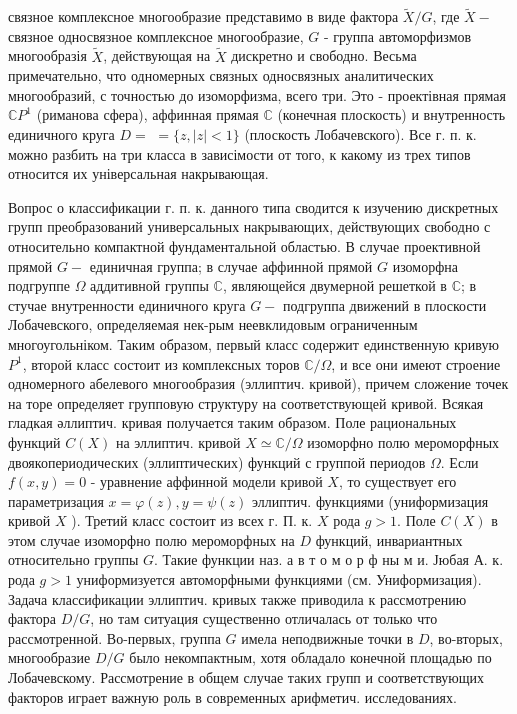 \documentclass[10pt]{article}
\begin{document}
связное комплексное многообразие представимо в виде фактора $\tilde{X} / G$, где $\tilde{X}-$ связное односвязное комплексное многообразие, $G$ - группа автоморфизмов многообразія $\tilde{X}$, действующая на $\tilde{X}$ дискретно и свободно. Весьма примечательно, что одномерных связных односвязных аналитических многообразий, с точностью до изоморфизма, всего три. Это - проектівная прямая $\mathbb{C} P^{1}$ (риманова сфера), аффинная прямая $\mathbb{C}$ (конечная плоскость) и внутренность единичного круга $D=$ $=\{z,|z|<1\}$ (плоскость Лобачевского). Все г. п. к. можно разбить на три класса в зависімости от того, к какому из трех типов относится их універсальная накрывающая.



Вопрос о классификации г. п. к. данного типа сводится к изучению дискретных групп преобразований универсальных накрывающих, действующих свободно с относительно компактной фундаментальной областью. В случае проективной прямой $G-$ единичная группа; в случае аффинной прямой $G$ изоморфна подгруппе $\Omega$ аддитивной группы $\mathbb{C}$, являющейся двумерной решеткой в $\mathbb{C}$; в стучае внутренности единичного круга $G-$ подгруппа движений в плоскости Лобачевского, определяемая нек-рым неевклидовым ограниченным многоугольніком. Таким образом, первый класс содержит единственную кривую $P^{1}$, второй класс состоит из комплексных торов $\mathbb{C} / \Omega$, и все они имеют строение одномерного абелевого многообразия (эллиптич. кривой), причем сложение точек на торе определяет групповую структуру на соответствующей кривой. Всякая гладкая әллиптич. кривая получается таким образом. Поле рациональных функций $C(X)$ на эллиптич. кривой $X \simeq \mathbb{C} / \Omega$ изоморфно полю мероморфных двоякопериодических (эллиптических) функций с группой периодов $\Omega$. Если $f(x, y)=0$ - уравнение аффинной модели кривой $X$, то существует его параметризация $x=\varphi(z), y=\psi(z)$ эллиптич. функциями (униформизация кривой $X$ ). Третий класс состоит из всех г. П. к. $X$ рода $g>1$. Поле $C(X)$ в этом случае изоморфно полю мероморфных на $D$ функций, инвариантных относительно группы $G$. Такие функции наз. а в т о м о р ф ны м и. Јюбая А. к. рода $g>1$ униформизуется автоморфными функциями (см. Униформизация). Задача классификации эллиптич. кривых также приводила к рассмотрению фактора $D / G$, но там ситуация существенно отличалась от только что рассмотренной. Во-первых, группа $G$ имела неподвижные точки в $D$, во-вторых, многообразие $D / G$ было некомпактным, хотя обладало конечной площадью по Лобачевскому. Рассмотрение в общем случае таких групп и соответствующих факторов играет важную роль в современных арифметич. исследованиях.
\end{document}
